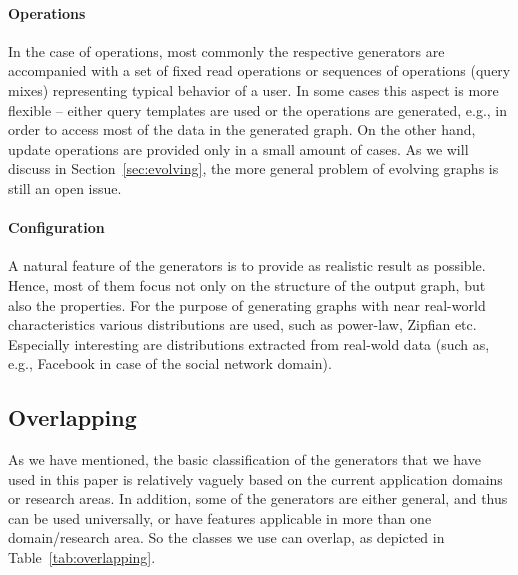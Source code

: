 \paragraph{Operations}
In the case of operations, most commonly the respective generators are accompanied with a set of fixed read operations or sequences of operations (query mixes) representing typical behavior of a user. In some cases this aspect is more flexible -- either query templates are used or the operations are generated, e.g., in order to access most of the data in the generated graph. On the other hand, update operations are provided only in a small amount of cases. As we will discuss in Section~\ref{sec:evolving}, the more general problem of evolving graphs is still an open issue.

\paragraph{Configuration}
A natural feature of the generators is to provide as realistic result as possible. Hence, most of them focus not only on the structure of the output graph, but also the properties. For the purpose of generating graphs with near real-world characteristics various distributions are used, such as power-law, Zipfian etc. Especially interesting are distributions extracted from real-wold data (such as, e.g., Facebook in case of the social network domain).

\subsection{Overlapping}
\label{sec:overlapping}

As we have mentioned, the basic classification of the generators that we have used in this paper is relatively vaguely based on the current application domains or research areas. In addition, some of the generators are either general, and thus can be used universally, or have features applicable in more than one domain/research area. So the classes we use can overlap, as depicted in Table~\ref{tab:overlapping}.

